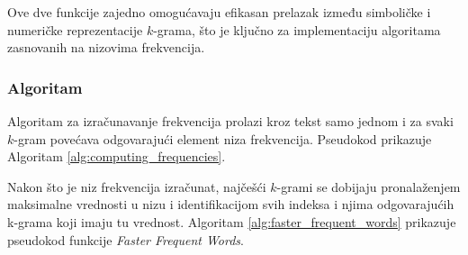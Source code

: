 \documentclass[12pt,oneside]{memoir}
\begin{document}
\begin{algorithm}[h]
\caption{NumberToPattern}
\label{alg:number_to_pattern}
\SetAlgoLined
\DontPrintSemicolon
{}
\end{algorithm}

Ove dve funkcije zajedno omogućavaju efikasan prelazak između simboličke i numeričke reprezentacije $k$-grama, što je ključno za implementaciju algoritama zasnovanih na nizovima frekvencija.



\subsubsection{Algoritam}

Algoritam za izračunavanje frekvencija prolazi kroz tekst samo jednom i za svaki $k$-gram povećava odgovarajući element niza frekvencija. Pseudokod prikazuje Algoritam \ref{alg:computing_frequencies}.

\begin{algorithm}[h]
\caption{Computing Frequencies}
\label{alg:computing_frequencies}
\SetAlgoLined
\DontPrintSemicolon
{}
\end{algorithm}



Nakon što je niz frekvencija izračunat, najčešći $k$-grami se dobijaju pronalaženjem maksimalne vrednosti u nizu i identifikacijom svih indeksa i njima odgovarajućih k-grama koji imaju tu vrednost. Algoritam \ref{alg:faster_frequent_words} prikazuje pseudokod funkcije \textit{Faster Frequent Words}.


\begin{algorithm}[h]
\caption{Faster Frequent Words}
\label{alg:faster_frequent_words}
\SetAlgoLined
\DontPrintSemicolon
{}
\end{algorithm}
\end{document}
